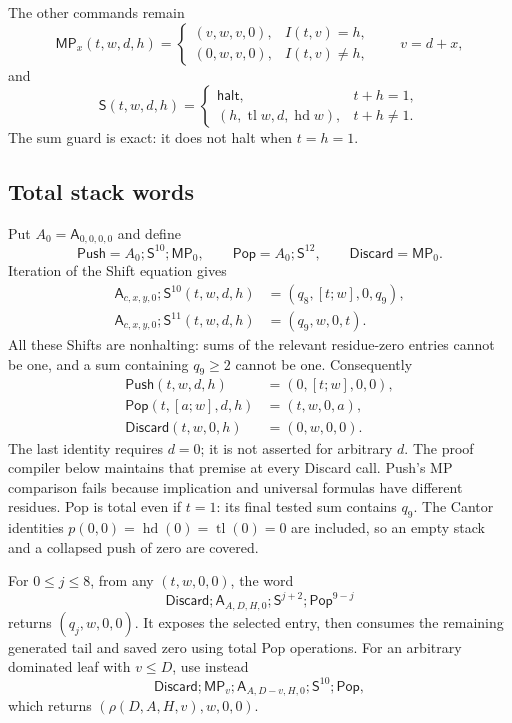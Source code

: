 The other commands remain
\[
 \mathsf{MP}_x(t,w,d,h)=
 \begin{cases}(v,w,v,0),&I(t,v)=h,\\
              (0,w,v,0),&I(t,v)\ne h,
 \end{cases}\qquad v=d+x,
\]
and
\[
 \mathsf S(t,w,d,h)=
 \begin{cases}\mathsf{halt},&t+h=1,\\
 (h,\operatorname{tl}w,d,\operatorname{hd}w),&t+h\ne1.
 \end{cases}
\]
The sum guard is exact: it does not halt when $t=h=1$.

\subsection{Total stack words}

Put $A_0=\mathsf A_{0,0,0,0}$ and define
\[
 \mathsf{Push}=A_0;\mathsf S^{10};\mathsf{MP}_0,\qquad
 \mathsf{Pop}=A_0;\mathsf S^{12},\qquad
 \mathsf{Discard}=\mathsf{MP}_0.
\]
Iteration of the Shift equation gives
\begin{align*}
 \mathsf A_{c,x,y,0};\mathsf S^{10}(t,w,d,h)
       &=(q_8,[t;w],0,q_9),\\
 \mathsf A_{c,x,y,0};\mathsf S^{11}(t,w,d,h)
       &=(q_9,w,0,t).
\end{align*}
All these Shifts are nonhalting: sums of the relevant residue-zero entries
cannot be one, and a sum containing $q_9\ge2$ cannot be one. Consequently
\begin{align*}
 \mathsf{Push}(t,w,d,h)&=(0,[t;w],0,0),\\
 \mathsf{Pop}(t,[a;w],d,h)&=(t,w,0,a),\\
 \mathsf{Discard}(t,w,0,h)&=(0,w,0,0).
\end{align*}
The last identity requires $d=0$; it is not asserted for arbitrary $d$.
The proof compiler below maintains that premise at every Discard call.
Push's MP comparison fails because implication and universal formulas have
different residues. Pop is total even if $t=1$: its final tested sum
contains $q_9$. The Cantor identities
$p(0,0)=\operatorname{hd}(0)=\operatorname{tl}(0)=0$ are included, so an
empty stack and a collapsed push of zero are covered.

For $0\le j\le8$, from any $(t,w,0,0)$, the word
\[
 \mathsf{Discard};\mathsf A_{A,D,H,0};
       \mathsf S^{j+2};\mathsf{Pop}^{9-j}
\]
returns $(q_j,w,0,0)$. It exposes the selected entry, then consumes the
remaining generated tail and saved zero using total Pop operations. For an
arbitrary dominated leaf with $v\le D$, use instead
\[
 \mathsf{Discard};\mathsf{MP}_v;
 \mathsf A_{A,D-v,H,0};\mathsf S^{10};\mathsf{Pop},
\]
which returns $(\rho(D,A,H,v),w,0,0)$.

